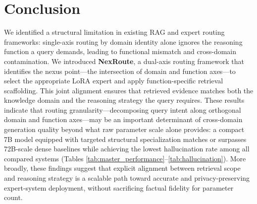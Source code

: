 \documentclass[a4paper,fleql]{cas-sc}
\begin{document}
\section{Conclusion}
\label{sec:conclusion}
We identified a structural limitation in existing RAG and expert routing
frameworks: single-axis routing by domain identity alone ignores the
reasoning function a query demands, leading to functional mismatch and
cross-domain contamination.
We introduced \textbf{NexRoute}, a dual-axis routing framework that identifies
the nexus point---the intersection of domain and function axes---to select
the appropriate LoRA expert and apply function-specific retrieval scaffolding.
This joint alignment ensures that retrieved evidence matches both the
knowledge domain and the reasoning strategy the query requires.
These results indicate that routing granularity---decomposing query intent
along orthogonal domain and function axes---may be an important determinant
of cross-domain generation quality beyond what raw parameter scale alone
provides: a compact 7B model equipped with targeted structural specialization
matches or surpasses 72B-scale dense baselines while achieving the lowest
hallucination rate among all compared systems (Tables
\ref{tab:master_performance}--\ref{tab:hallucination}). More broadly, these
findings suggest that explicit alignment between retrieval scope and reasoning
strategy is a scalable path toward accurate and privacy-preserving expert-system
deployment, without sacrificing factual fidelity for parameter count.

\printcredits
\end{document}
